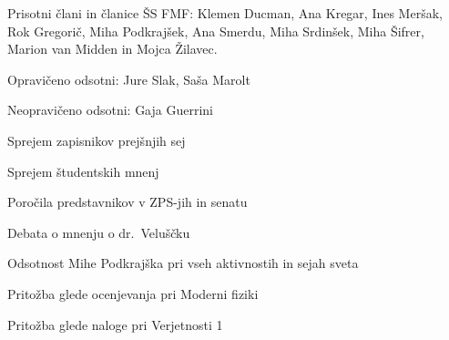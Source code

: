 \documentclass{seja}
\begin{document}
Prisotni člani in članice ŠS FMF: Klemen Ducman, Ana Kregar, Ines Meršak, Rok Gregorič, Miha Podkrajšek, Ana Smerdu, Miha Srdinšek, Miha Šifrer, Marion van Midden in Mojca Žilavec.

Opravičeno odsotni: Jure Slak, Saša Marolt

Neopravičeno odsotni: Gaja Guerrini

\begin{red*}
\item Sprejem zapisnikov prejšnjih sej
\item Sprejem študentskih mnenj
\item Poročila predstavnikov v ZPS-jih in senatu
\item Debata o mnenju o dr.~Veluščku
\item Odsotnost Mihe Podkrajška pri vseh aktivnostih in sejah sveta
\item Pritožba glede ocenjevanja pri Moderni fiziki
\item Pritožba glede naloge pri Verjetnosti 1
\end{red*}
\end{document}
